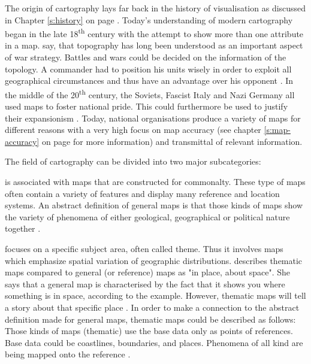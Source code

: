 The origin of cartography lays far back in the history of visualisation as discussed in Chapter \ref{s:history} on page \pageref{s:history}. Today's understanding of modern cartography began in the late 18\textsuperscript{th} century with the attempt to show more than one attribute in a map. \citeauthor{Longley2005} say, that topography has long been understood as an important aspect of war strategy. Battles and wars could be decided on the information of the topology. A commander had to position his units wisely in order to exploit all geographical circumstances and thus have an advantage over his opponent .
In the middle of the 20\textsuperscript{th} century, the Soviets, Fascist Italy and Nazi Germany all used maps to foster national pride. This could furthermore be used to justify their expansionism .
Today, national organisations produce a variety of maps for different reasons with a very high focus on map accuracy (see chapter \ref{s:map-accuracy} on page \pageref{s:map-accuracy} for more information) and transmittal of relevant information.

The field of cartography can be divided into two major subcategories:
\begin{enumerate}
 is associated with maps that are constructed for commonalty. These type of maps often contain a variety of features and display many reference and location systems. An abstract definition of general maps is that those kinds of maps show the variety of phenomena of either geological, geographical or political nature together .

 focuses on a specific subject area, often called theme. Thus it involves maps which emphasize spatial variation of geographic distributions. \citeauthor{BartzPetchenik1979} describes thematic maps compared to general (or reference) maps as "in place, about space". She says that a general map is characterised by the fact that it shows you where something is in space, according to the example. However, thematic maps will tell a story about that specific place .
In order to make a connection to the abstract definition \citeauthor{Thrower2008} made for general maps, thematic maps could be described as follows:
Those kinds of maps (thematic) use the base data only as points of references. Base data could be coastlines, boundaries, and places. Phenomena of all kind are being mapped onto the reference .
\end{enumerate}

